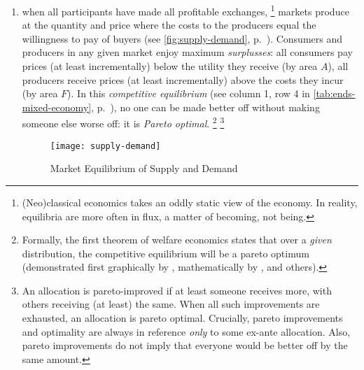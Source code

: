 \begin{enumerate}
	\item
		when all  participants have made all profitable exchanges,
		\footnote{
			(Neo)classical economics takes an oddly static view of the economy.
			In reality, equilibria are more often in flux, a matter of becoming, not being.
		}
		markets produce at the quantity and price where the costs to the producers equal the willingness to pay of buyers (see \autoref{fig:supply-demand}, p.~\pageref{fig:supply-demand}).
		Consumers and producers in any given market enjoy maximum \emph{surplusses}:
all consumers pay prices (at least incrementally) below the utility they receive (by area $A$), all producers receive prices (at least incrementally) above the costs they incur (by area $F$).
		In this \emph{competitive equilibrium} (see column 1, row 4 in \autoref{tab:ends-mixed-economy}, p.~\pageref{tab:ends-mixed-economy}), no one can be made better off without making someone else worse off:
it is \emph{Pareto optimal}.
		\footnote{\label{fn:1st-theorem}
			Formally, the first theorem of welfare economics states that over a \emph{given} distribution, the competitive equilibrium will be a pareto optimum (demonstrated first graphically by \cite{Lerner1944}, mathematically by \cite{Lange1934}, \cite{Debreu1954} and others).
		}
		\footnote{
			An allocation is pareto-improved if at least someone receives more, with others receiving (at least) the same.
			When all such improvements are exhausted, an allocation is pareto optimal.
			Crucially, pareto improvements and optimality are always in reference \emph{only} to some ex-ante allocation.
			Also, pareto improvements do not imply that everyone would be better off by the same amount.
		}
	\begin{figure}[htbp]
		\centering
		\texttt{[image: supply-demand]}
		\caption{Market Equilibrium of Supply and Demand}
		\label{fig:supply-demand}
	\end{figure}


\end{enumerate}
